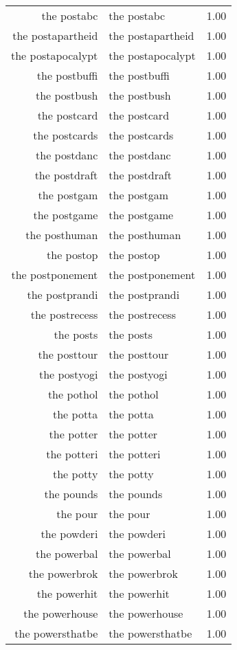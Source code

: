 \begin{table}[ht]
\begin{tabular}{rlr}
  the postabc & the postabc & 1.00 \\ 
  the postapartheid & the postapartheid & 1.00 \\ 
  the postapocalypt & the postapocalypt & 1.00 \\ 
  the postbuffi & the postbuffi & 1.00 \\ 
  the postbush & the postbush & 1.00 \\ 
  the postcard & the postcard & 1.00 \\ 
  the postcards & the postcards & 1.00 \\ 
  the postdanc & the postdanc & 1.00 \\ 
  the postdraft & the postdraft & 1.00 \\ 
  the postgam & the postgam & 1.00 \\ 
  the postgame & the postgame & 1.00 \\ 
  the posthuman & the posthuman & 1.00 \\ 
  the postop & the postop & 1.00 \\ 
  the postponement & the postponement & 1.00 \\ 
  the postprandi & the postprandi & 1.00 \\ 
  the postrecess & the postrecess & 1.00 \\ 
  the posts & the posts & 1.00 \\ 
  the posttour & the posttour & 1.00 \\ 
  the postyogi & the postyogi & 1.00 \\ 
  the pothol & the pothol & 1.00 \\ 
  the potta & the potta & 1.00 \\ 
  the potter & the potter & 1.00 \\ 
  the potteri & the potteri & 1.00 \\ 
  the potty & the potty & 1.00 \\ 
  the pounds & the pounds & 1.00 \\ 
  the pour & the pour & 1.00 \\ 
  the powderi & the powderi & 1.00 \\ 
  the powerbal & the powerbal & 1.00 \\ 
  the powerbrok & the powerbrok & 1.00 \\ 
  the powerhit & the powerhit & 1.00 \\ 
  the powerhouse & the powerhouse & 1.00 \\ 
  the powersthatbe & the powersthatbe & 1.00 \\ 

\end{tabular}
\end{table}
